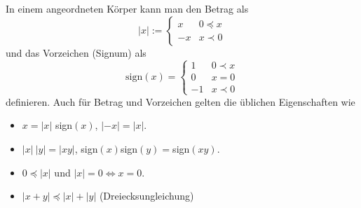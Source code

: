 \documentclass[letterpaper,10pt,english]{jupyterBook}
\begin{document}
In einem angeordneten Körper kann man den Betrag als
\begin{equation*}
\vert x \vert := \left\{ \begin{array}{rl} x & 0 \preceq x \\ -x & x \prec 0 \end{array} \right.
\end{equation*}
und das Vorzeichen (Signum) als
\begin{equation*}
\text{sign}(x) =  \left\{ \begin{array}{rl} 1 & 0 \prec  x \\ 0 & x =0\\-1 & x \prec 0 \end{array}\right.
\end{equation*}
definieren. Auch für Betrag und Vorzeichen gelten die üblichen Eigenschaften wie
\begin{itemize}
\item {} 
\(x = |x|\) sign\((x)\), \(|-x|=|x|\).

\item {} 
\(|x|~|y|=|xy|\), sign\((x)\)sign\((y) = \)sign\((xy)\).

\item {} 
\(0 \preceq |x|\) und \(|x|=0 \Leftrightarrow x =0\).

\item {} 
\(|x+y| \preceq |x|+|y|\) (Dreiecksungleichung)

\end{itemize}
\end{document}

